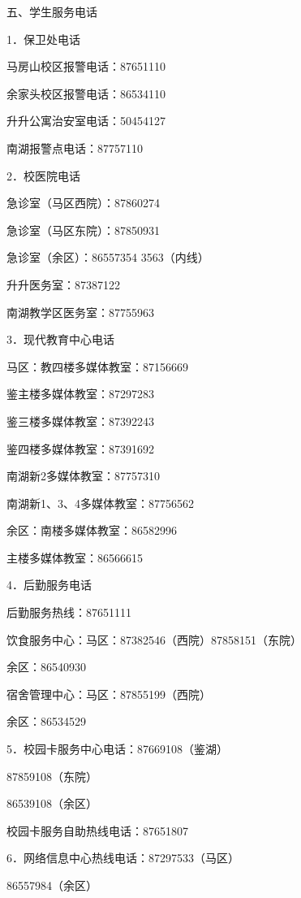 \documentclass[UTF8,12pt,a4paper]{report}
\begin{document}
五、学生服务电话

1．保卫处电话

马房山校区报警电话：87651110

余家头校区报警电话：86534110

升升公寓治安室电话：50454127

南湖报警点电话：87757110

2．校医院电话

急诊室（马区西院）：87860274

急诊室（马区东院）：87850931

急诊室（余区）：86557354 3563（内线）

升升医务室：87387122

南湖教学区医务室：87755963

3．现代教育中心电话

马区：教四楼多媒体教室：87156669

鉴主楼多媒体教室：87297283

鉴三楼多媒体教室：87392243

鉴四楼多媒体教室：87391692

南湖新2多媒体教室：87757310

南湖新1、3、4多媒体教室：87756562

余区：南楼多媒体教室：86582996

主楼多媒体教室：86566615

4．后勤服务电话

后勤服务热线：87651111

饮食服务中心：马区：87382546（西院）87858151（东院）

余区：86540930

宿舍管理中心：马区：87855199（西院）

余区：86534529

5．校园卡服务中心电话：87669108（鉴湖）

87859108（东院）

86539108（余区）

校园卡服务自助热线电话：87651807

6．网络信息中心热线电话：87297533（马区）

86557984（余区）
\end{document}
